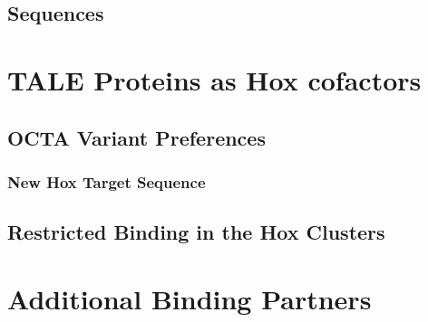 
\subsection{Sequences}


\section{TALE Proteins as Hox cofactors}

\subsection{OCTA Variant Preferences}

\subsubsection{New Hox Target Sequence}

\subsection{Restricted Binding in the Hox Clusters}



\section{Additional Binding Partners}